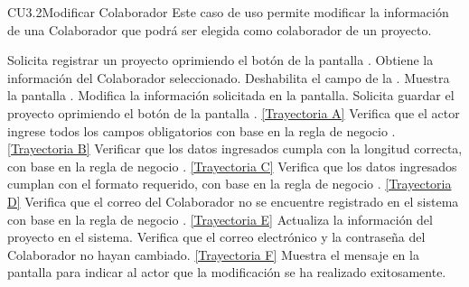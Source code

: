\begin{UseCase}{CU3.2}{Modificar Colaborador}{
		Este caso de uso permite modificar la información de una Colaborador que podrá ser elegida como colaborador de un proyecto.
	}
{		}
	\end{UseCase}
	\begin{UCtrayectoria}
		\UCpaso[\UCactor] Solicita registrar un proyecto oprimiendo el botón \editar de la pantalla .
		\UCpaso[\UCsist] Obtiene la información del Colaborador seleccionado.
		\UCpaso[\UCsist] Deshabilita el campo de la .
		\UCpaso[\UCsist] Muestra la pantalla .
		\UCpaso[\UCactor] Modifica la información solicitada en la pantalla. \label{CU3.2-P5}
		\UCpaso[\UCactor] Solicita guardar el proyecto oprimiendo el botón  de la pantalla . \hyperlink{CU3-2:TAA}{[Trayectoria A]}
		\UCpaso[\UCsist] Verifica que el actor ingrese todos los campos obligatorios con base en la regla de negocio . \hyperlink{CU3-2:TAB}{[Trayectoria B]}
		\UCpaso[\UCsist] Verificar que los datos ingresados cumpla con la longitud correcta, con base en la regla de negocio . \hyperlink{CU3-2:TAC}{[Trayectoria C]} 
		\UCpaso[\UCsist] Verifica que los datos ingresados cumplan con el formato requerido, con base en la regla de negocio . \hyperlink{CU3-2:TAD}{[Trayectoria D]} 
		\UCpaso[\UCsist] Verifica que el correo del Colaborador no se encuentre registrado en el sistema con base en la regla de negocio . \hyperlink{CU3-2:TAE}{[Trayectoria E]}\label{CU3.2-P10}
		\UCpaso[\UCsist] Actualiza la información del proyecto en el sistema.
		\UCpaso[\UCsist] Verifica que el correo electrónico y la contraseña del Colaborador no hayan cambiado. \hyperlink{CU3-2:TAF}{[Trayectoria F]}
		\UCpaso[\UCsist] Muestra el mensaje  en la pantalla  para indicar al actor que la modificación se ha realizado exitosamente. 
	\end{UCtrayectoria}		
